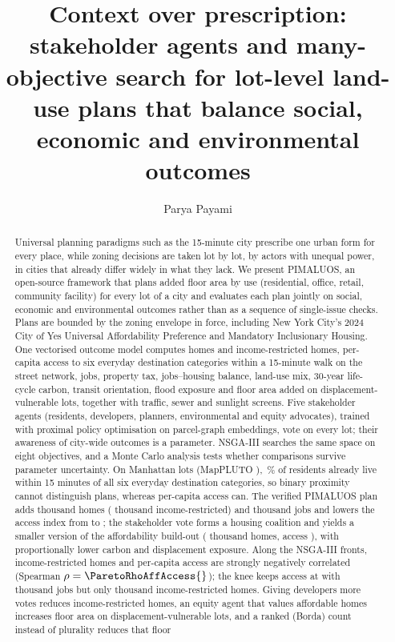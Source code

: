 \documentclass[preprint,12pt]{elsarticle}
\begin{document}
\begin{frontmatter}

\title{Context over prescription: stakeholder agents and many-objective search for lot-level land-use plans that balance social, economic and environmental outcomes}

\author[uwm]{Parya Payami}

\begin{abstract}
Universal planning paradigms such as the 15-minute city prescribe one urban form for every place, while zoning decisions are taken lot by lot, by actors with unequal power, in cities that already differ widely in what they lack. We present PIMALUOS, an open-source framework that plans added floor area by use (residential, office, retail, community facility) for every lot of a city and evaluates each plan jointly on social, economic and environmental outcomes rather than as a sequence of single-issue checks. Plans are bounded by the zoning envelope in force, including New York City's 2024 City of Yes Universal Affordability Preference and Mandatory Inclusionary Housing. One vectorised outcome model computes homes and income-restricted homes, per-capita access to six everyday destination categories within a 15-minute walk on the street network, jobs, property tax, jobs--housing balance, land-use mix, 30-year life-cycle carbon, transit orientation, flood exposure and floor area added on displacement-vulnerable lots, together with traffic, sewer and sunlight screens. Five stakeholder agents (residents, developers, planners, environmental and equity advocates), trained with proximal policy optimisation on parcel-graph embeddings, vote on every lot; their awareness of city-wide outcomes is a parameter. NSGA-III searches the same space on eight objectives, and a Monte Carlo analysis tests whether comparisons survive parameter uncertainty. On \NParcels{} Manhattan lots (MapPLUTO \PlutoRelease{}), \BaseFullPct{}\,\% of residents already live within 15 minutes of all six everyday destination categories, so binary proximity cannot distinguish plans, whereas per-capita access can. The verified PIMALUOS plan adds \PimHomesKVer{} thousand homes (\PimAffHomesKVer{} thousand income-restricted) and \PimJobsKVer{} thousand jobs and lowers the access index from \BaseAccess{} to \PimAccessVer{}; the stakeholder vote forms a housing coalition and yields a smaller version of the affordability build-out (\BoUapHomesKVer{} thousand homes, access \BoUapAccessVer{}), with proportionally lower carbon and displacement exposure. Along the NSGA-III fronts, income-restricted homes and per-capita access are strongly negatively correlated (Spearman $\rho=\ParetoRhoAffAccess{}$); the knee keeps access at \KneeAccess{} with \KneeJobsK{} thousand jobs but only \KneeAffHomesK{} thousand income-restricted homes. Giving developers more votes reduces income-restricted homes, an equity agent that values affordable homes increases floor area on displacement-vulnerable lots, and a ranked (Borda) count instead of plurality reduces that floor 
\end{abstract}
\end{frontmatter}
\end{document}
